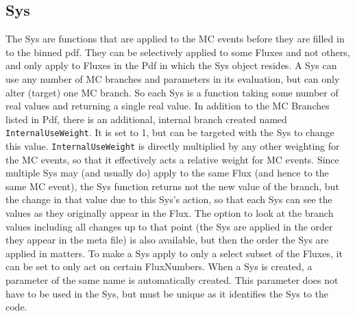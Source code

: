\subsection{Sys}
\label{sec:Sys}
The Sys are functions that are applied to the MC events before they
are filled in to the binned pdf.  They can be selectively applied to
some Fluxes and not others, and only apply to Fluxes in the Pdf in
which the Sys object resides.  A Sys can use any number of MC branches
and parameters in its evaluation, but can only alter (target) one MC
branch.  So each Sys is a function taking some number of real values
and returning a single real value.  In addition to the MC Branches
listed in Pdf, there is an additional, internal branch created named
\verb|InternalUseWeight|.  It is set to 1, but can be targeted with
the Sys to change this value.  \verb|InternalUseWeight| is directly
multiplied by any other weighting for the MC events, so that it
effectively acts a relative weight for MC events.  Since multiple Sys
may (and usually do) apply to the same Flux (and hence to the same MC
event), the Sys function returns not the new value of the branch, but
the change in that value due to this Sys's action, so that each Sys
can see the values as they originally appear in the Flux.  The option
to look at the branch values including all changes up to that point
(the Sys are applied in the order they appear in the meta file) is
also available, but then the order the Sys are applied in matters.  To
make a Sys apply to only a select subset of the Fluxes, it can be set
to only act on certain FluxNumbers.  When a Sys is created, a
parameter of the same name is automatically created.  This parameter
does not have to be used in the Sys, but must be unique as it
identifies the Sys to the code.


